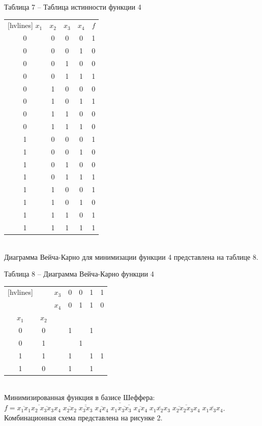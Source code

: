 \documentclass[a4paper,14pt]{extarticle}
\begin{document}
  \noindent Таблица 7 -- Таблица истинности функции 4 \\
  \begin{NiceTabular}{ccccc}[hvlines]
    $x_1$ & $x_2$ & $x_3$ & $x_4$ & $f$ \\
    0 & 0 & 0 & 0 & 1 \\
    0 & 0 & 0 & 1 & 0 \\
    0 & 0 & 1 & 0 & 0 \\
    0 & 0 & 1 & 1 & 1 \\
    0 & 1 & 0 & 0 & 0 \\
    0 & 1 & 0 & 1 & 1 \\
    0 & 1 & 1 & 0 & 0 \\
    0 & 1 & 1 & 1 & 0 \\
    1 & 0 & 0 & 0 & 1 \\
    1 & 0 & 0 & 1 & 0 \\
    1 & 0 & 1 & 0 & 0 \\
    1 & 0 & 1 & 1 & 1 \\
    1 & 1 & 0 & 0 & 1 \\
    1 & 1 & 0 & 1 & 0 \\
    1 & 1 & 1 & 0 & 1 \\
    1 & 1 & 1 & 1 & 1
  \end{NiceTabular}\\
  
  \pagebreak
  Диаграмма Вейча-Карно для минимизации функции 4 представлена на таблице 8.
  
  \noindent Таблица 8 -- Диаграмма Вейча-Карно функции 4 \\
  \begin{NiceTabular}{ccccccc}[hvlines]
    & & $x_3$ & 0 & 0 & 1 & 1 \\
    & & $x_4$ & 0 & 1 & 1 & 0 \\
    $x_1$ & $x_2$ & & & & & \\
    0 & 0 & & 1 & & 1 & \\
    0 & 1 & & & 1 & & \\
    1 & 1 & & 1 & & 1 & 1 \\
    1 & 0 & & 1 & & 1 & \\
  \end{NiceTabular} \\
  
  Минимизированная функция в базисе Шеффера:\\
  $f=\overline{
    \overline{\overline{x_1x_1}x_2\;\overline{x_3x_3}x_4}\;
    \overline{\overline{x_2x_2}\;\overline{x_3x_3}\;\overline{x_4x_4}}\;
    \overline{x_1\overline{x_3x_3}\;\overline{x_4x_4}}\;
    \overline{x_1x_2x_3}\;
    \overline{\overline{x_2x_2}x_3x_4}\;
    \overline{x_1x_3x_4}
  }$. Комбинационная схема представлена на рисунке 2.
  
\end{document}
